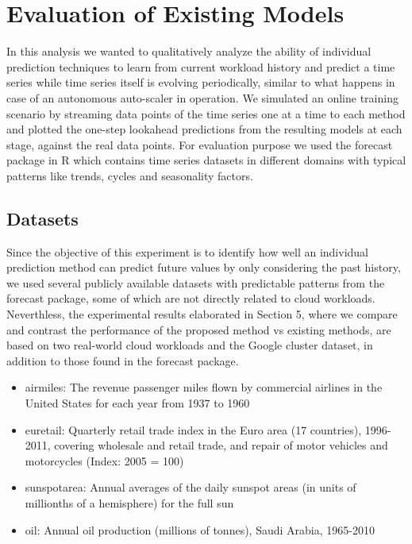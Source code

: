 \section{Evaluation of Existing Models}

In this analysis we wanted to qualitatively analyze the ability of individual prediction techniques to learn from current workload history and predict a time series while time series itself is evolving periodically, similar to what happens in case of an autonomous auto-scaler in operation. We simulated an online training scenario by streaming data points of the time series one at a time to each method and plotted the one-step lookahead predictions from the resulting models at each stage, against the real data points. For evaluation purpose we used the forecast package in R \cite{forecastPackage} which contains time series datasets in different domains with typical patterns like trends, cycles and seasonality factors.

\subsection{Datasets}
Since the objective of this experiment is to identify how well an individual prediction method can predict future values by only considering the past history, we used several publicly available datasets with predictable patterns from the forecast package, some of which are not directly related to cloud workloads. Neverthless, the experimental results elaborated in Section 5, where we compare and contrast the performance of the proposed method vs existing methods, are based on two real-world cloud workloads and the Google cluster dataset, in addition to those found in the forecast package.

\begin{itemize}
\item airmiles: The revenue passenger miles flown by commercial airlines in the United States for each year from 1937 to 1960
\item euretail: Quarterly retail trade index in the Euro area (17 countries), 1996-2011, covering wholesale and retail trade, and repair of motor vehicles and motorcycles (Index: 2005 = 100)
\item sunspotarea: Annual averages of the daily sunspot areas (in units of millionths of a hemisphere) for the full sun
\item oil: Annual oil production (millions of tonnes), Saudi Arabia, 1965-2010
\end{itemize}


